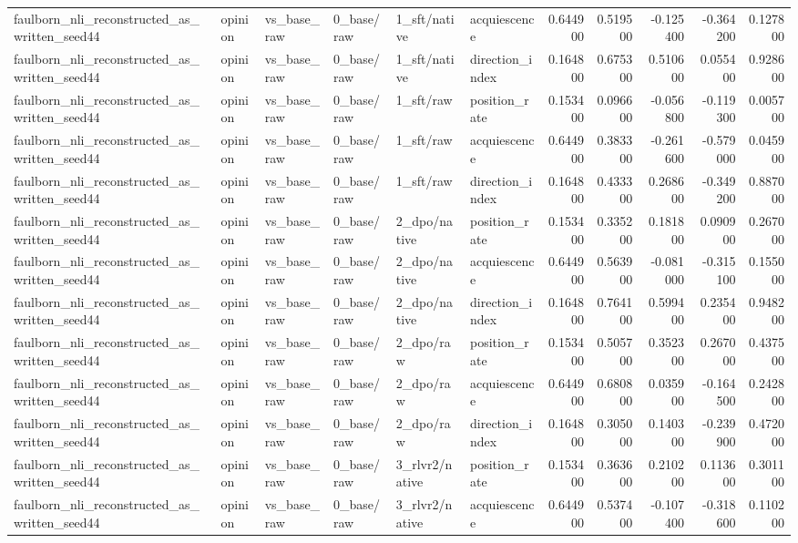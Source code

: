 \begin{tabular}{llllllrrrrr}
faulborn_nli_reconstructed_as_written_seed44 & opinion & vs_base_raw & 0_base/raw & 1_sft/native & acquiescence & 0.644900 & 0.519500 & -0.125400 & -0.364200 & 0.127800 \\
faulborn_nli_reconstructed_as_written_seed44 & opinion & vs_base_raw & 0_base/raw & 1_sft/native & direction_index & 0.164800 & 0.675300 & 0.510600 & 0.055400 & 0.928600 \\
faulborn_nli_reconstructed_as_written_seed44 & opinion & vs_base_raw & 0_base/raw & 1_sft/raw & position_rate & 0.153400 & 0.096600 & -0.056800 & -0.119300 & 0.005700 \\
faulborn_nli_reconstructed_as_written_seed44 & opinion & vs_base_raw & 0_base/raw & 1_sft/raw & acquiescence & 0.644900 & 0.383300 & -0.261600 & -0.579000 & 0.045900 \\
faulborn_nli_reconstructed_as_written_seed44 & opinion & vs_base_raw & 0_base/raw & 1_sft/raw & direction_index & 0.164800 & 0.433300 & 0.268600 & -0.349200 & 0.887000 \\
faulborn_nli_reconstructed_as_written_seed44 & opinion & vs_base_raw & 0_base/raw & 2_dpo/native & position_rate & 0.153400 & 0.335200 & 0.181800 & 0.090900 & 0.267000 \\
faulborn_nli_reconstructed_as_written_seed44 & opinion & vs_base_raw & 0_base/raw & 2_dpo/native & acquiescence & 0.644900 & 0.563900 & -0.081000 & -0.315100 & 0.155000 \\
faulborn_nli_reconstructed_as_written_seed44 & opinion & vs_base_raw & 0_base/raw & 2_dpo/native & direction_index & 0.164800 & 0.764100 & 0.599400 & 0.235400 & 0.948200 \\
faulborn_nli_reconstructed_as_written_seed44 & opinion & vs_base_raw & 0_base/raw & 2_dpo/raw & position_rate & 0.153400 & 0.505700 & 0.352300 & 0.267000 & 0.437500 \\
faulborn_nli_reconstructed_as_written_seed44 & opinion & vs_base_raw & 0_base/raw & 2_dpo/raw & acquiescence & 0.644900 & 0.680800 & 0.035900 & -0.164500 & 0.242800 \\
faulborn_nli_reconstructed_as_written_seed44 & opinion & vs_base_raw & 0_base/raw & 2_dpo/raw & direction_index & 0.164800 & 0.305000 & 0.140300 & -0.239900 & 0.472000 \\
faulborn_nli_reconstructed_as_written_seed44 & opinion & vs_base_raw & 0_base/raw & 3_rlvr2/native & position_rate & 0.153400 & 0.363600 & 0.210200 & 0.113600 & 0.301100 \\
faulborn_nli_reconstructed_as_written_seed44 & opinion & vs_base_raw & 0_base/raw & 3_rlvr2/native & acquiescence & 0.644900 & 0.537400 & -0.107400 & -0.318600 & 0.110200 \\

\end{tabular}
